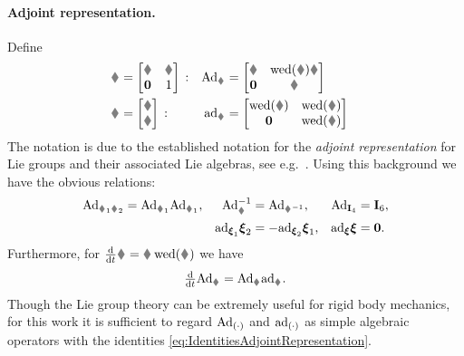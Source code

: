 \paragraph{Adjoint representation.}
Define
\begin{subequations}
\begin{align}
 \G &= \begin{bmatrix} \R & \r \\ \mat{0} & 1 \end{bmatrix} \, :&
 \Ad{\G} &= \begin{bmatrix} \R & \wedOp(\r) \R \\ \mat{0} & \R \end{bmatrix}&
 \label{eq:defAdjointSE3}
\\
 \bodyVel{}{} &= \begin{bmatrix} \v \\ \w \end{bmatrix} \, :&
 \ad{\bodyVel{}{}} &= \begin{bmatrix} \wedOp(\w) & \wedOp(\v) \\ \mat{0} & \wedOp(\w) \end{bmatrix}&
\end{align}
\end{subequations}
The notation is due to the established notation for the \textit{adjoint representation} for Lie groups and their associated Lie algebras, see e.g.\ \cite[Def.\ 3.32 \& 3.7]{Hall:LieGroups}.
Using this background we have the obvious relations:
\begin{subequations}\label{eq:IdentitiesAdjointRepresentation}
\begin{align}
 \Ad{\G_1 \G_2} &= \Ad{\G_1} \Ad{\G_1},&
 \Ad{\G}^{-1} &= \Ad{\G^{-1}},&
 \Ad{\idMat[4]} &= \idMat[6],
\\
 &&
 \ad{\tuple{\xi}_1}\tuple{\xi}_2 &= -\ad{\tuple{\xi}_2}\tuple{\xi}_1,&
 \ad{\tuple{\xi}}\tuple{\xi} &= \tuple{0}.
\end{align}
\end{subequations}
Furthermore, for $\tdiff{t} \G = \G \wedOp(\bodyVel{}{})$ we have
\begin{align}
 \tdiff{t}\Ad{\G} = \Ad{\G} \ad{\bodyVel{}{}}.
\end{align}
Though the Lie group theory can be extremely useful for rigid body mechanics, for this work it is sufficient to regard $\text{Ad}_{(\cdot)}$ and $\text{ad}_{(\cdot)}$ as simple algebraic operators with the identities \eqref{eq:IdentitiesAdjointRepresentation}.



